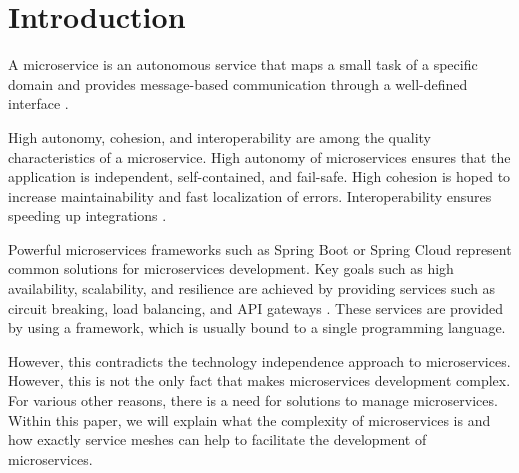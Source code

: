 \section{Introduction}

A microservice is an autonomous service that maps a small task of a specific domain and provides message-based communication through a well-defined interface \cite[p. 18]{microservices-general}.

High autonomy, cohesion, and interoperability are among the quality characteristics of a microservice. High autonomy of microservices ensures that the application is independent, self-contained, and fail-safe. High cohesion is hoped to increase maintainability and fast localization of errors. Interoperability ensures speeding up integrations \cite[p. 208 ff.]{microservices-general}.

Powerful microservices frameworks such as Spring Boot or Spring Cloud represent common solutions for microservices development. Key goals such as high availability, scalability, and resilience are achieved by providing services such as circuit breaking, load balancing, and API gateways \cite{spring-cloud}. These services are provided by using a framework, which is usually bound to a single programming language.

However, this contradicts the technology independence approach \cite{from-monolith} to microservices. However, this is not the only fact that makes microservices development complex. For various other reasons, there is a need for solutions to manage microservices. Within this paper, we will explain what the complexity of microservices is and how exactly service meshes can help to facilitate the development of microservices. 